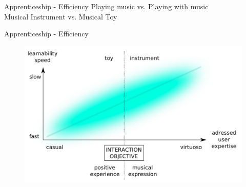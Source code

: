 \documentclass{beamer}
\begin{document}
\begin{frame}{Apprenticeship - Efficiency}
    Playing music vs. Playing with music\\
    \vspace{5mm}
    Musical Instrument vs. Musical Toy
\end{frame}

\begin{frame}{Apprenticeship - Efficiency}
    \begin{figure}[h]
        \includegraphics[width=\textwidth]{toy.png}
    \end{figure}
\end{frame}
\end{document}

